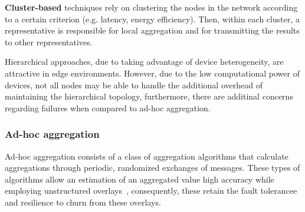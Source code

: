 
\textbf{Cluster-based} techniques rely on clustering the nodes in the network according to a certain criterion (e.g. latency, energy efficiency). Then, within each cluster, a representative is responsible for local aggregation and for transmitting the results to other representatives. 

Hierarchical approaches, due to taking advantage of device heterogeneity, are attractive in edge environments. However, due to the low computational power of devices, not all nodes may be able to handle the additional overhead of maintaining the hierarchical topology, furthermore, there are additinal concerns regarding failures when compared to ad-hoc aggregation.


\subsubsection*{Ad-hoc aggregation}

Ad-hoc aggregation consists of a class of aggregation algorithms that calculate aggregations through periodic, randomized exchanges of messages. These types of algorithms allow an estimation of an aggregated value high accuracy while employing unstructured overlays~\cite{gossip_aggregation}, consequently, these retain the fault tolerancee and resilience to churn from these overlays.




